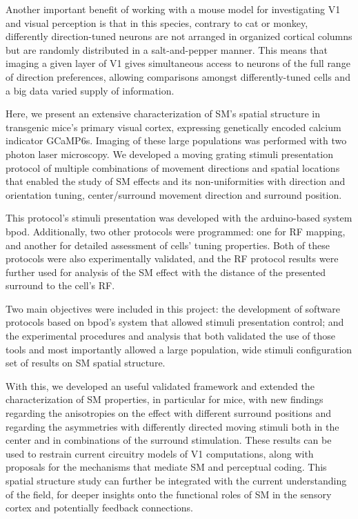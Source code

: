 Another important benefit of working with a mouse model for investigating V1 and visual perception is that in this species, contrary to cat or monkey, differently direction-tuned neurons are not arranged in organized cortical columns but are randomly distributed in a salt-and-pepper manner. This means that imaging a given layer of V1 gives simultaneous access to neurons of the full range of direction preferences, allowing comparisons amongst differently-tuned cells and a big data varied supply of information.

Here, we present an extensive characterization of SM's spatial structure in transgenic mice's primary visual cortex, expressing genetically encoded calcium indicator GCaMP6s. Imaging of these large populations was performed with two photon laser microscopy. We developed a moving grating stimuli presentation protocol of multiple combinations of movement directions and spatial locations that enabled the study of SM effects and its non-uniformities with direction and orientation tuning, center/surround movement direction and surround position. 

This protocol's stimuli presentation was developed with the arduino-based system bpod. Additionally, two other protocols were programmed: one for RF mapping, and another for detailed assessment of cells' tuning properties. Both of these protocols were also experimentally validated, and the RF protocol results were further used for analysis of the SM effect with the distance of the presented surround to the cell's RF.

Two main objectives were included in this project: the development of software protocols based on bpod's system that allowed stimuli presentation control; and the experimental procedures and analysis that both validated the use of those tools and most importantly allowed a large population, wide stimuli configuration set of results on SM spatial structure.

With this, we developed an useful validated framework and extended the characterization of SM properties, in particular for mice, with new findings regarding the anisotropies on the effect with different surround positions and regarding the asymmetries with differently directed moving stimuli both in the center and in combinations of the surround stimulation. These results can be used to restrain current circuitry models of V1 computations, along with proposals for the mechanisms that mediate SM and perceptual coding. This spatial structure study can further be integrated with the current understanding of the field, for deeper insights onto the functional roles of SM in the sensory cortex and potentially feedback connections.

